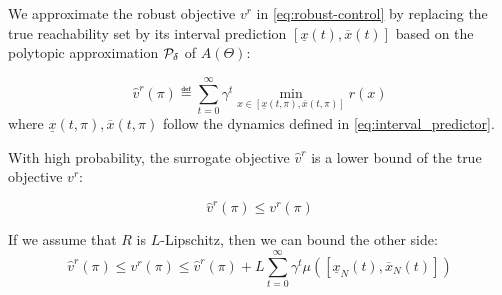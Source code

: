 \documentclass{article}
\begin{document}
\begin{definition}
We approximate the robust objective $v^r$ in \eqref{eq:robust-control} by replacing the true reachability set by its interval prediction $[\underline{x}(t), \overline{x}(t)]$ based on the polytopic approximation $\mathcal{P}_\delta$ of $A(\Theta)$: 

\begin{equation}
\hat{v}^r(\pi) \eqdef \sum_{t=0}^\infty \gamma^t \min_{x\in[\underline{x}(t, \pi), \overline{x}(t, \pi)]}  r(x)
\end{equation}
where $\underline{x}(t, \pi), \overline{x}(t, \pi)$ follow the dynamics defined in \eqref{eq:interval_predictor}.
\end{definition}

%

\begin{property}
\label{prop:lower-bound}
With high probability, the surrogate objective $\hat{v}^r$ is a lower bound of the true objective $v^r$:

\begin{equation}
\hat{v}^r(\pi) \leq v^r(\pi)
\end{equation}

If we assume that $R$ is $L$-Lipschitz, then we can bound the other side:
\begin{equation*}
     \hat{v}^r(\pi) \leq v^r(\pi) \leq \hat{v}^r(\pi) + L\sum_{t=0}^\infty \gamma^t \mu([\underline{x}_N(t),\overline{x}_N(t)])
\end{equation*}
\end{property}
\end{document}
